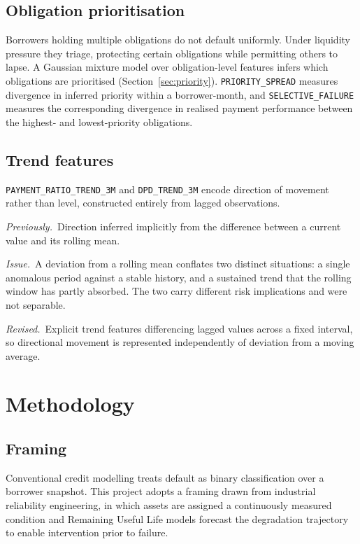 \documentclass[11pt,a4paper]{article}
\newcommand{\designnote}[3]{%
  \par\vspace{7pt}
  \begin{list}{}{%
    \setlength{\leftmargin}{2em}\setlength{\rightmargin}{1em}%
    \setlength{\labelwidth}{0pt}\setlength{\labelsep}{0pt}%
    \setlength{\itemsep}{2pt}\setlength{\topsep}{0pt}%
    \setlength{\parsep}{0pt}}
    \item[]\textit{Previously.}~#1
    \item[]\textit{Issue.}~#2
    \item[]\textit{Revised.}~#3
  \end{list}
  \par\vspace{7pt}
}
\begin{document}
\subsection{Obligation prioritisation}

Borrowers holding multiple obligations do not default uniformly. Under liquidity pressure
they triage, protecting certain obligations while permitting others to lapse. A Gaussian
mixture model over obligation-level features infers which obligations are prioritised
(Section~\ref{sec:priority}). \texttt{PRIORITY\_\allowbreak SPREAD} measures divergence in inferred
priority within a borrower-month, and \texttt{SELECTIVE\_\allowbreak FAILURE} measures the
corresponding divergence in realised payment performance between the highest- and
lowest-priority obligations.

\subsection{Trend features}

\texttt{PAYMENT\_\allowbreak RATIO\_\allowbreak TREND\_3M} and \texttt{DPD\_TREND\_3M} encode direction of
movement rather than level, constructed entirely from lagged observations.

\designnote{Direction inferred implicitly from the difference between a current value and
its rolling mean.}
{A deviation from a rolling mean conflates two distinct situations: a single anomalous
period against a stable history, and a sustained trend that the rolling window has partly
absorbed. The two carry different risk implications and were not separable.}
{Explicit trend features differencing lagged values across a fixed interval, so
directional movement is represented independently of deviation from a moving average.}

\section{Methodology}

\subsection{Framing}

Conventional credit modelling treats default as binary classification over a borrower
snapshot. This project adopts a framing drawn from industrial reliability engineering, in
which assets are assigned a continuously measured condition and Remaining Useful Life
models forecast the degradation trajectory to enable intervention prior to failure.
\end{document}
